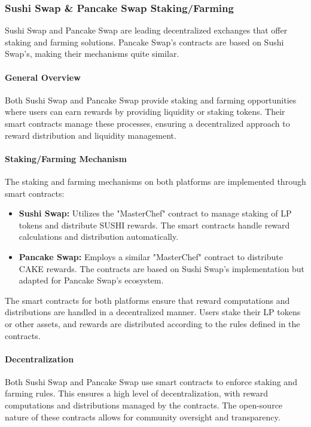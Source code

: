\documentclass[12pt,parskip=full, tikz]{article}
\begin{document}
\subsubsection{Sushi Swap \& Pancake Swap Staking/Farming}

Sushi Swap and Pancake Swap are leading decentralized exchanges that offer staking and farming solutions. Pancake Swap’s contracts are based on Sushi Swap's, making their mechanisms quite similar.

\paragraph{General Overview}
Both Sushi Swap and Pancake Swap provide staking and farming opportunities where users can earn rewards by providing liquidity or staking tokens. Their smart contracts manage these processes, ensuring a decentralized approach to reward distribution and liquidity management.

\paragraph{Staking/Farming Mechanism}
The staking and farming mechanisms on both platforms are implemented through smart contracts:

\begin{itemize}
    \item \textbf{Sushi Swap:} Utilizes the "MasterChef" contract to manage staking of LP tokens and distribute SUSHI rewards. The smart contracts handle reward calculations and distribution automatically.
    \item \textbf{Pancake Swap:} Employs a similar "MasterChef" contract to distribute CAKE rewards. The contracts are based on Sushi Swap's implementation but adapted for Pancake Swap's ecosystem.
\end{itemize}

The smart contracts for both platforms ensure that reward computations and distributions are handled in a decentralized manner. Users stake their LP tokens or other assets, and rewards are distributed according to the rules defined in the contracts.

\paragraph{Decentralization}
Both Sushi Swap and Pancake Swap use smart contracts to enforce staking and farming rules. This ensures a high level of decentralization, with reward computations and distributions managed by the contracts. The open-source nature of these contracts allows for community oversight and transparency.
\end{document}
